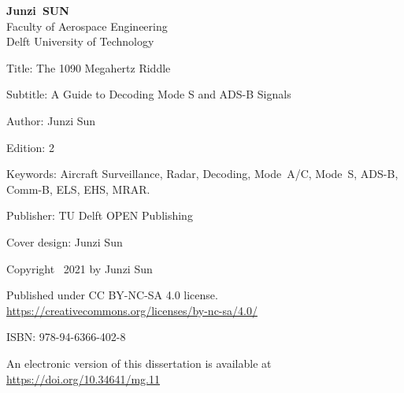\begin{titlepage}

\thispagestyle{empty}




{
    \centering
    \vspace*{2\bigskipamount}
        
    {\makeatletter
    \titlestyle\bfseries\Huge\@title
    \makeatother}

    {\makeatletter
    \ifx\@subtitle\undefined\else
        \bigskip
        \titlefont\titleshape\LARGE\@subtitle
    \fi
    \makeatother}


    \vspace*{30\bigskipamount}


    \makeatletter
    {
        \Large{\titlefont\bfseries{Junzi}\ {SUN}} \\
        \vspace*{1\bigskipamount}
        \normalsize{Faculty of Aerospace Engineering} \\
        \normalsize{Delft University of Technology} \\
    }
    \makeatother

}



\clearpage


\thispagestyle{empty}

\vspace*{16\bigskipamount}


Title: The 1090 Megahertz Riddle

\smallskip

Subtitle: A Guide to Decoding Mode S and ADS-B Signals

\smallskip

Author: Junzi Sun

\smallskip

Edition: 2

\smallskip

Keywords: Aircraft Surveillance, Radar, Decoding, Mode~A/C, Mode~S, ADS-B, Comm-B, ELS, EHS, MRAR.

\smallskip

Publisher: TU Delft OPEN Publishing

\smallskip

Cover design: Junzi Sun

\vspace{4\bigskipamount}


Copyright \textcopyright\ 2021 by Junzi Sun

\medskip

Published under CC BY-NC-SA 4.0 license.\\
\url{https://creativecommons.org/licenses/by-nc-sa/4.0/}

\medskip
ISBN: 978-94-6366-402-8

\medskip
\medskip
An electronic version of this dissertation is available at \\
\url{https://doi.org/10.34641/mg.11}

\end{titlepage}